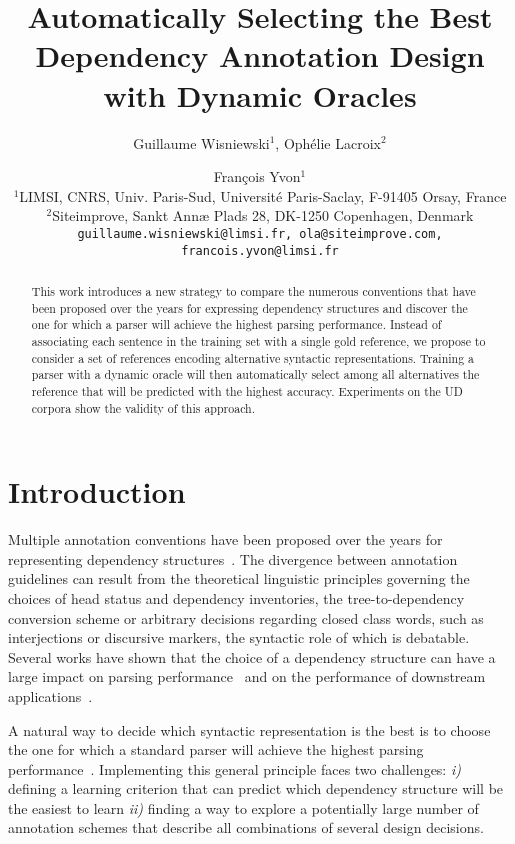 \documentclass[11pt,letterpaper]{article}
\title{Automatically Selecting the Best Dependency Annotation Design
  with Dynamic Oracles}
\author{Guillaume Wisniewski$^1$, Oph\'elie Lacroix$^2$ \and Fran\c{c}ois Yvon$^1$ \\
		$^1$LIMSI, CNRS, Univ. Paris-⁠Sud, Universit\'{e} Paris-Saclay, F-91405 Orsay, France \\
		$^2$Siteimprove, Sankt Ann{\ae} Plads 28, DK-1250 Copenhagen, Denmark \\
		{\tt guillaume.wisniewski@limsi.fr, ola@siteimprove.com, francois.yvon@limsi.fr}\\
		}
\date{}
\begin{document}
\maketitle

\begin{abstract}
  This work introduces a new strategy to compare the numerous
  conventions that have been proposed over the years for
  expressing dependency structures and discover the one for which a
  parser will achieve the highest parsing performance. Instead of
  associating each sentence in the training set with a single gold
  reference, we propose to consider a set of references encoding
  alternative syntactic representations. Training a parser with a
  dynamic oracle will then automatically select among all alternatives
  the reference that will be predicted with the highest accuracy.
  Experiments on the UD corpora show the validity of this approach.
\end{abstract}


\section{Introduction}

Multiple annotation conventions have been proposed over the years for
representing dependency
structures~\cite{hajic01prague,demarneffe14universal}. %
The divergence between annotation guidelines can result from the
theoretical linguistic principles governing the choices of head status
and dependency inventories, the tree-to-dependency conversion scheme
or arbitrary decisions regarding closed class words, such as
interjections or discursive markers, the syntactic role of which is
debatable. Several works have shown that the choice of a dependency
structure can have a large impact on parsing
performance~\cite{silveira15does,delhoneux2016representation,kohita17multilingual}
and on the performance of downstream
applications~\cite{elming13downstream}.

A natural way to decide which syntactic representation is the
best is to choose the one for which a standard parser will achieve the
highest parsing
performance~\cite{schwartz12learnability,husain12analyzing,noro05evalaution}. Implementing
this general principle faces two challenges: \textit{i)} defining a
learning criterion that can predict which dependency structure will be
the easiest to learn \textit{ii)} finding a way to explore a
potentially large number of annotation schemes that describe all
combinations of several design decisions.
\end{document}
